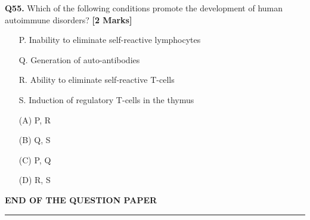 \documentclass[11pt]{article}
\newcommand{\questionb}[2]{
    \noindent\textbf{Q#2.} #1 \hfill \textbf{[2 Marks]}
}
\begin{document}
\vspace{0.5cm}

\questionb{Which of the following conditions promote the development of human autoimmune disorders?}{55}
\begin{enumerate}
\item[P.] Inability to eliminate self-reactive lymphocytes  
\item [Q.] Generation of auto-antibodies  
\item [R.] Ability to eliminate self-reactive T-cells  
\item [S.] Induction of regulatory T-cells in the thymus 
\end{enumerate}

\begin{enumerate}
    \item[(A)] P, R
    \item[(B)] Q, S  
    \item[(C)] P, Q
    \item[(D)] R, S
\end{enumerate}

\vspace{0.5cm}

\vspace{5cm}
\begin{center}
\textbf{END OF THE QUESTION PAPER}
\rule{\textwidth}{0.5pt} 
\end{center}
\end{document}
